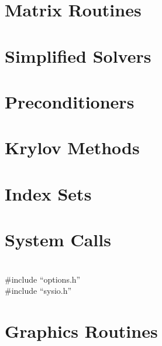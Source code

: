 \section{Matrix Routines}


{\small
\noindent

}

\section{Simplified Solvers}


{\small
\noindent

}

\section{Preconditioners}


{\small
\noindent

}

\section{Krylov Methods}


{\small
\noindent

}

\section{Index Sets}


{\small
\noindent

}

\section{System Calls}

 \\
{  \#include ``options.h''} \\
{  \#include ``sysio.h''}

{\small
\noindent

}

\section{Graphics Routines}


{\small
\noindent

}


